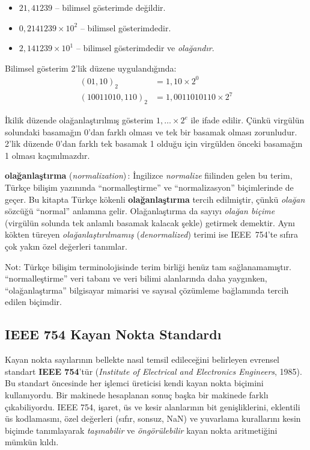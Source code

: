 \begin{itemize}
\item $21{,}41239$ -- bilimsel gösterimde değildir.
\item $0{,}2141239 \times 10^2$ -- bilimsel gösterimdedir.
\item $2{,}141239 \times 10^1$ -- bilimsel gösterimdedir ve \emph{olağandır}.
\end{itemize}

Bilimsel gösterim 2'lik düzene uygulandığında:
\begin{align*}
(01{,}10)_2 &= 1{,}10 \times 2^0 \\
(10011010{,}110)_2 &= 1{,}0011010110 \times 2^7
\end{align*}

İkilik düzende olağanlaştırılmış gösterim $1{,}\ldots \times 2^e$ ile ifade edilir. Çünkü virgülün solundaki basamağın 0'dan farklı olması ve tek bir basamak olması zorunludur. 2'lik düzende 0'dan farklı tek basamak 1 olduğu için virgülden önceki basamağın 1 olması kaçınılmazdır.

\begin{terimnotu}
\textbf{olağanlaştırma} (\emph{normalization})\,: İngilizce \emph{normalize} fiilinden gelen bu terim, Türkçe bilişim yazınında ``normalleştirme'' ve ``normalizasyon'' biçimlerinde de geçer. Bu kitapta Türkçe kökenli \textbf{olağanlaştırma} tercih edilmiştir, çünkü \emph{olağan} sözcüğü ``normal'' anlamına gelir. Olağanlaştırma da sayıyı \emph{olağan biçime} (virgülün solunda tek anlamlı basamak kalacak şekle) getirmek demektir. Aynı kökten türeyen \emph{olağanlaştırılmamış} (\emph{denormalized}) terimi ise IEEE~754'te sıfıra çok yakın özel değerleri tanımlar.

Not: Türkçe bilişim terminolojisinde terim birliği henüz tam sağlanamamıştır. ``normalleştirme'' veri tabanı ve veri bilimi alanlarında daha yaygınken, ``olağanlaştırma'' bilgisayar mimarisi ve sayısal çözümleme bağlamında tercih edilen biçimdir.
\end{terimnotu}

\subsection{IEEE 754 Kayan Nokta Standardı}
\label{sec:ieee754}

Kayan nokta sayılarının bellekte nasıl temsil edileceğini belirleyen evrensel standart \textbf{IEEE 754}'tür (\emph{Institute of Electrical and Electronics Engineers}, 1985). Bu standart öncesinde her işlemci üreticisi kendi kayan nokta biçimini kullanıyordu. Bir makinede hesaplanan sonuç başka bir makinede farklı çıkabiliyordu. IEEE 754, işaret, üs ve kesir alanlarının bit genişliklerini, eklentili üs kodlamasını, özel değerleri (sıfır, sonsuz, NaN) ve yuvarlama kurallarını kesin biçimde tanımlayarak \emph{taşınabilir} ve \emph{öngörülebilir} kayan nokta aritmetiğini mümkün kıldı.

